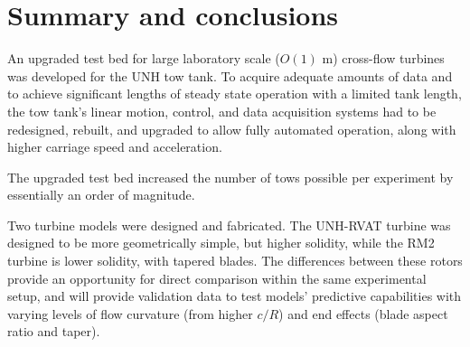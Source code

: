 \section{Summary and conclusions}

An upgraded test bed for large laboratory scale ($O(1)$ m) cross-flow turbines
was developed for the UNH tow tank. To acquire adequate amounts of data and to
achieve significant lengths of steady state operation with a limited tank
length, the tow tank's linear motion, control, and data acquisition systems had
to be redesigned, rebuilt, and upgraded to allow fully automated operation,
along with higher carriage speed and acceleration.

The upgraded test bed increased the number of tows possible per experiment by
essentially an order of magnitude.

Two turbine models were designed and fabricated. The UNH-RVAT turbine was
designed to be more geometrically simple, but higher solidity, while the RM2
turbine is lower solidity, with tapered blades. The differences between these
rotors provide an opportunity for direct comparison within the same experimental
setup, and will provide validation data to test models' predictive capabilities
with varying levels of flow curvature (from higher $c/R$) and end effects (blade
aspect ratio and taper).
